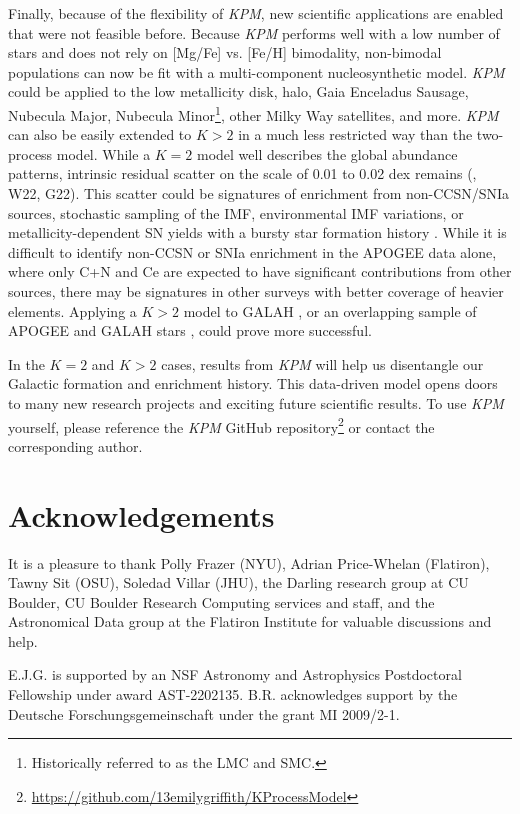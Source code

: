 \documentclass[modern]{aastex631}
\newcommand{\name}{\textsl{KPM}}
\begin{document}
Finally, because of the flexibility of \name{}, new scientific applications are enabled that were not feasible before. Because \name{} performs well with a low number of stars and does not rely on [Mg/Fe] vs. [Fe/H] bimodality, non-bimodal populations can now be fit with a multi-component nucleosynthetic model. \name{} could be applied to the low metallicity disk, halo, Gaia Enceladus Sausage, Nubecula Major, Nubecula Minor\footnote{Historically referred to as the LMC and SMC.}, other Milky Way satellites, and more. \name{} can also be easily extended to $K>2$ in a much less restricted way than the two-process model. While a $K=2$ model well describes the global abundance patterns, intrinsic residual scatter on the scale of 0.01 to 0.02 dex remains (\citealp{ting2022}, W22, G22). This scatter could be signatures of enrichment from non-CCSN/SNIa sources, stochastic sampling of the IMF, environmental IMF variations, or metallicity-dependent SN yields with a bursty star formation history \citep[e.g.][]{belokurov2022, griffith2023}. While it is difficult to identify non-CCSN or SNIa enrichment in the APOGEE data alone, where only C+N and Ce are expected to have significant contributions from other sources, there may be signatures in other surveys with better coverage of heavier elements. Applying a $K>2$ model to GALAH \citep{buder2021}, or an overlapping sample of APOGEE and GALAH stars \citep{nandakumar2022}, could prove more successful. 

In the $K=2$ and $K>2$ cases, results from \name{} will help us disentangle our Galactic formation and enrichment history. This data-driven model opens doors to many new research projects and exciting future scientific results. To use \name{} yourself, please reference the \name{} GitHub repository\footnote{\url{https://github.com/13emilygriffith/KProcessModel}} or contact the corresponding author. 


\section{Acknowledgements}
It is a pleasure to thank
  Polly Frazer (NYU),
  Adrian Price-Whelan (Flatiron),
  Tawny Sit (OSU),
  Soledad Villar (JHU),
  the Darling research group at CU Boulder,
  CU Boulder Research Computing services and staff,
  and the Astronomical Data group at the Flatiron Institute
for valuable discussions and help.

E.J.G. is supported by an NSF Astronomy and Astrophysics Postdoctoral Fellowship under award AST-2202135.
B.R. acknowledges support by the Deutsche Forschungsgemeinschaft under the 
grant MI 2009/2-1.
\end{document}
